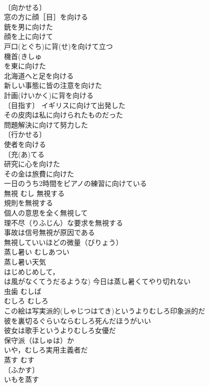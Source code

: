 \documentclass[8pt]{extreport}
\begin{document}
\begin{CJK}{UTF8}{min}
\\	〔向かせる〕
\\	窓の方に顔［目］を向ける 
\\	銃を男に向けた 
\\	顔を上に向けて 
\\	戸口(とぐち)に背(せ)を向けて立つ 
\\	機首(きしゅ　
\\	を東に向けた 
\\	北海道へと足を向ける 
\\	新しい事態に皆の注意を向けた 
\\	計画(けいかく)に背を向ける 
\\	〔目指す〕 イギリスに向けて出発した 
\\	その皮肉は私に向けられたものだった 
\\	問題解決に向けて努力した 
\\	〔行かせる〕
\\	使者を向ける 
\\	〔充(あ)てる　
\\	研究に心を向けた 
\\	その金は旅費に向けた 
\\	一日のうち2時間をピアノの練習に向けている 
\\	無視	むし	無視する 
\\	規則を無視する 
\\	個人の意思を全く無視して 
\\	理不尽（りふじん）な要求を無視する 
\\	事故は信号無視が原因である 
\\	無視していいほどの微量（びりょう） 
\\	蒸し暑い	むしあつい	
\\	蒸し暑い天気 
\\	はじめじめして，
\\	は風がなくてうだるような) 今日は蒸し暑くてやり切れない 
\\	虫歯	むしば	
\\	むしろ	むしろ	
\\	この絵は写実派的(しゃじつはてき)というよりむしろ印象派的だ 
\\	彼を裏切るぐらいならむしろ死んだほうがいい 
\\	彼女は歌手というよりむしろ女優だ 
\\	保守派（ほしゅは）か
\\	いや，むしろ実用主義者だ 
\\	蒸す	むす	
\\	〔ふかす〕
\\	いもを蒸す 

\end{CJK}
\end{document}
